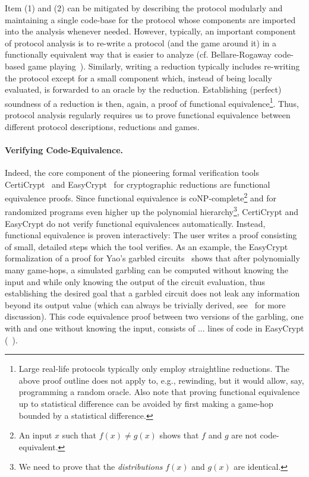 Item (1) and (2) can be mitigated by describing the protocol
modularly and maintaining a single code-base for the protocol
whose components are imported into the analysis whenever needed.
However, typically, an important component of protocol analysis 
is to re-write a protocol (and the game around it) in a 
functionally equivalent way that is easier
to analyze (cf. Bellare-Rogaway code-based
game playing~\cite{EC:BelRog06}).
Similarly, writing a reduction typically includes re-writing the protocol 
except for a small component which, instead of being locally evaluated, 
is forwarded to an oracle by the reduction. Establishing (perfect) soundness of 
a reduction is then, again, a proof of functional equivalence\footnote{Large 
real-life protocols typically only employ straightline reductions. The 
above proof outline does not apply to, e.g., rewinding, but it would 
allow, say, programming a random oracle. Also note that proving functional equivalence 
up to statistical difference can be avoided by first making a game-hop
bounded by a statistical difference.}. Thus, protocol analysis regularly
requires us to prove functional equivalence between different protocol descriptions,
reductions and games.

\paragraph{Verifying Code-Equivalence.}
Indeed, the core component of the pioneering formal
verification tools CertiCrypt~\cite{X} and EasyCrypt~\cite{X} for 
cryptographic reductions are functional equivalence proofs. Since functional 
equivalence is coNP-complete\footnote{An input $x$ such that 
$f(x)\neq g(x)$ shows that $f$ and $g$ are not code-equivalent.} and 
for randomized programs even higher up the polynomial hierarchy\footnote{We need to prove that the \emph{distributions} $f(x)$ and $g(x)$ are identical.}, 
CertiCrypt and EasyCrypt do not verify functional equivalences automatically.
Instead, functional equivalence is proven interactively: The user writes
a proof consisting of small, detailed steps which the tool verifies.
As an example, the EasyCrypt formalization
of a proof for Yao's garbled circuits~\cite{X} shows that after polynomially many game-hops, a simulated garbling can be computed without knowing the input and while only knowing the output of the circuit evaluation, thus establishing the desired goal that a garbled circuit does not leak any information beyond its output value (which can
always be trivially derived, see~\cite{X} for more discussion). This code equivalence proof between two versions of the garbling, one with and one without
knowing the input, consists of ... lines of code in EasyCrypt (~\cite[page x]{X}).

